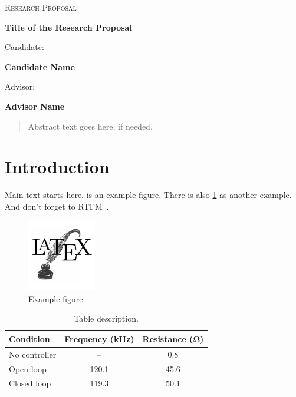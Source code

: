\documentclass[english, a4paper, 11pt]{article}
\begin{document}
\thispagestyle{unicamp}

\begin{center}

	\null\vfill

	{\scshape\large Research Proposal\par}

	\baselineskip

	{\LARGE\bfseries Title of the Research Proposal\par}

	\baselineskip

	Candidate:\\[1ex]
	{\large\bfseries Candidate Name\par}

	\baselineskip

	Advisor:\\[1ex]
	{\large\bfseries Advisor Name\par}

\end{center}

\vfill

\begin{abstract}
	Abstract text goes here, if needed.
\end{abstract}

\newpage

\onehalfspacing

\section{Introduction}

Main text starts here.
 is an example figure.
There is also \cref{tab:example} as another example.
And don't forget to \gls{RTFM}~\cite{oetiker_not_2015, latex_wikibook}.

\begin{figure}[htp]
	\centering
	\includegraphics[width=3cm]{example}
	\caption{Example figure}
	\label{fig:example}
\end{figure}

\begin{table}[hbp]
	\centering
	\caption{Table description.}
	\label{tab:example}
	\begin{tabular}{lcc}
		\toprule
		Condition     & Frequency (\si{kHz}) & Resistance (\si{\ohm}) \\
		\midrule
		No controller & --                   & \num{0.8}              \\
		Open loop     & \num{120.1}          & \num{45.6}             \\
		Closed loop   & \num{119.3}          & \num{50.1}             \\
		\bottomrule
	\end{tabular}
\end{table}
\end{document}
